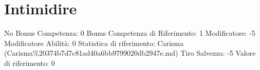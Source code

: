 \section{Intimidire}\label{intimidire}

\begin{description}
\tightlist
\item[Tags: ABI]
No Bonus Competenza: 0 Bonus Competenza di Riferimento: 1 Modificatore:
-5 Modificatore Abilità: 0 Statistica di riferimento: Carisma
(Carisma\%20374b7d7c81ad40a6bb9799020db2947e.md) Tiro Salvezza: -5
Valore di riferimento: 0
\end{description}
